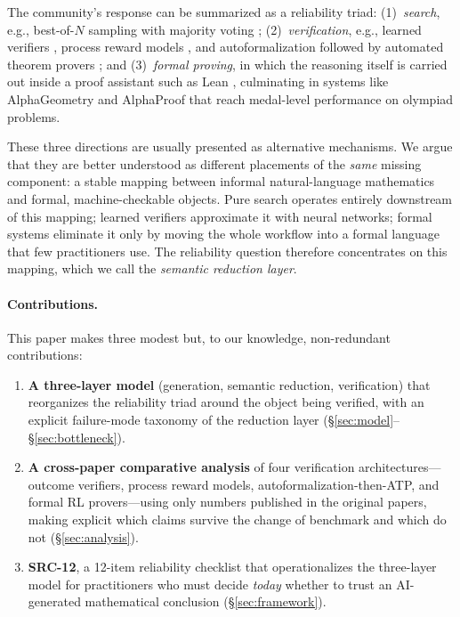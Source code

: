 \documentclass[11pt,a4paper]{article}
\begin{document}
The community's response can be summarized as a reliability triad: (1)~\emph{search}, e.g., best-of-$N$ sampling with majority voting \citep{cobbe2021gsm8k,lightman2024verify}; (2)~\emph{verification}, e.g., learned verifiers \citep{cobbe2021gsm8k}, process reward models \citep{uesato2022feedback,lightman2024verify}, and autoformalization followed by automated theorem provers \citep{zhou2024dtv}; and (3)~\emph{formal proving}, in which the reasoning itself is carried out inside a proof assistant such as Lean \citep{demoura2021lean4}, culminating in systems like AlphaGeometry \citep{trinh2024alphageometry} and AlphaProof \citep{hubert2025alphaproof} that reach medal-level performance on olympiad problems.

These three directions are usually presented as alternative mechanisms. We argue that they are better understood as different placements of the \emph{same} missing component: a stable mapping between informal natural-language mathematics and formal, machine-checkable objects. Pure search operates entirely downstream of this mapping; learned verifiers approximate it with neural networks; formal systems eliminate it only by moving the whole workflow into a formal language that few practitioners use. The reliability question therefore concentrates on this mapping, which we call the \emph{semantic reduction layer}.

\paragraph{Contributions.} This paper makes three modest but, to our knowledge, non-redundant contributions:
\begin{enumerate}
  \item \textbf{A three-layer model} (generation, semantic reduction, verification) that reorganizes the reliability triad around the object being verified, with an explicit failure-mode taxonomy of the reduction layer (\S\ref{sec:model}--\S\ref{sec:bottleneck}).
  \item \textbf{A cross-paper comparative analysis} of four verification architectures---outcome verifiers, process reward models, autoformalization-then-ATP, and formal RL provers---using only numbers published in the original papers, making explicit which claims survive the change of benchmark and which do not (\S\ref{sec:analysis}).
  \item \textbf{SRC-12}, a 12-item reliability checklist that operationalizes the three-layer model for practitioners who must decide \emph{today} whether to trust an AI-generated mathematical conclusion (\S\ref{sec:framework}).
\end{enumerate}
\end{document}
